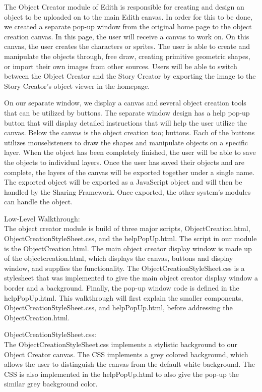 \documentclass[a4paper, 11pt]{article} %
\begin{document}
The Object Creator module of Edith is responsible for creating and design an object to be uploaded on to the main Edith canvas. In order for this to be done, we created a separate pop-up window from the original home page to the object creation canvas. In this page, the user will receive a canvas to work on. On this canvas, the user creates the characters or sprites. The user is able to create and manipulate the objects through, free draw, creating primitive geometric shapes, or import their own images from other sources. Users will be able to switch between the Object Creator and the Story Creator by exporting the image to the Story Creator’s object viewer in the homepage. 

On our separate window, we display a canvas and several object creation tools that can be utilized by buttons. The separate window design has a help pop-up button that will display detailed instructions that will help the user utilize the canvas. Below the canvas is the object creation too; buttons. Each of the buttons utilizes mouselisteners to draw the shapes and manipulate objects on a specific layer. When the object has been completely finished, the user will be able to save the objects to individual layers. Once the user has saved their objects and are complete, the layers of the canvas will be exported together under a single name. The exported object will be exported as a JavaScript object and will then be handled by the Sharing Framework.  Once exported, the other system’s modules can handle the object. 


Low-Level Walkthrough:\\

The object creator module is build of three major scripts, ObjectCreation.html, ObjectCreationStyleSheet.css, and the helpPopUp.html. The script in our module is the ObjectCreation.html. The main object creator display window is made up of the objectcreation.html, which displays the canvas, buttons and display window, and supplies the functionality.  The ObjectCreationStyleSheet.css is a stylesheet that was implemented to give the main object creator display window a border and a background. Finally, the pop-up window code is defined in the helpPopUp.html. This walkthrough will first explain the smaller components, ObjectCreationStyleSheet.css, and helpPopUp.html, before addressing the ObjectCreation.html.

ObjectCreationStyleSheet.css:\\

The ObjectCreationStyleSheet.css implements a stylistic background to our Object Creator canvas. The CSS implements a grey colored background, which allows the user to distinguish the canvas from the default white background. The CSS is also implemented in the helpPopUp.html to also give the pop-up the similar grey background color. 
\end{document}
